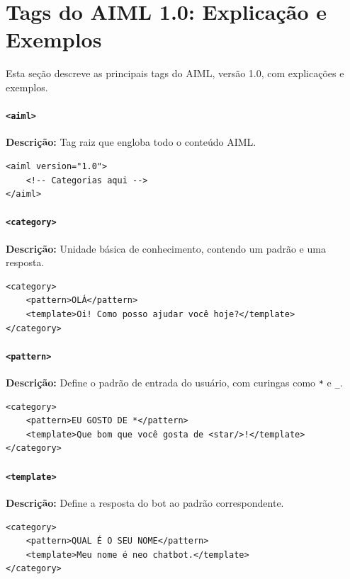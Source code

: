 \documentclass[14pt,a4paper,oneside]{book}
\begin{document}
\section{Tags do AIML 1.0: Explicação e Exemplos}

Esta seção descreve as principais tags do AIML, versão 1.0, com explicações e exemplos.

\paragraph{\texttt{<aiml>}} 

\textbf{Descrição:} Tag raiz que engloba todo o conteúdo AIML. 

\begin{lstlisting}
<aiml version="1.0">
	<!-- Categorias aqui -->
</aiml>
\end{lstlisting}

\paragraph{\texttt{<category>}} 

\textbf{Descrição:} Unidade básica de conhecimento, contendo um padrão e uma resposta. 

\begin{lstlisting}
<category>
	<pattern>OLÁ</pattern>
	<template>Oi! Como posso ajudar você hoje?</template>
</category>
\end{lstlisting}

\paragraph{\texttt{<pattern>}} 

\textbf{Descrição:} Define o padrão de entrada do usuário, com curingas como \texttt{*} e \texttt{\_}. 

\begin{lstlisting}
<category>
	<pattern>EU GOSTO DE *</pattern>
	<template>Que bom que você gosta de <star/>!</template>
</category>
\end{lstlisting}

\paragraph{\texttt{<template>}} 

\textbf{Descrição:} Define a resposta do bot ao padrão correspondente. 

\begin{lstlisting}
<category>
	<pattern>QUAL É O SEU NOME</pattern>
	<template>Meu nome é neo chatbot.</template>
</category> 
\end{lstlisting}
\end{document}
